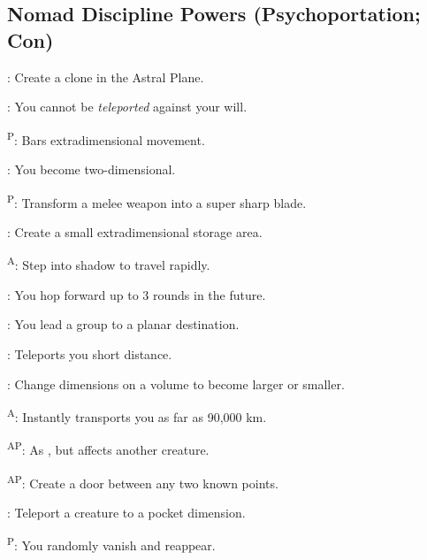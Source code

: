 \subsection{Nomad Discipline Powers {\normalsize(Psychoportation; Con)}}
\begin{enumerate*}
\item {}: Create a clone in the Astral Plane.

      : You cannot be \emph{teleported} against your will.

\item {}\textsuperscript{P}: Bars extradimensional movement.

      : You become two-dimensional.

\item {}\textsuperscript{P}: Transform a melee weapon into a super sharp blade.

      : Create a small extradimensional storage area.

      \textsuperscript{A}: Step into shadow to travel rapidly.

      : You hop forward up to 3 rounds in the future.

\item {}: You lead a group to a planar destination.

      : Teleports you short distance. %

      : Change dimensions on a volume to become larger or smaller.

\item {}\textsuperscript{A}: Instantly transports you as far as 90,000 km.

      \textsuperscript{AP}: As , but affects another creature.

      \textsuperscript{AP}: Create a door between any two known points.

\item {}: Teleport a creature to a pocket dimension.

      \textsuperscript{P}: You randomly vanish and reappear.


\end{enumerate*}
